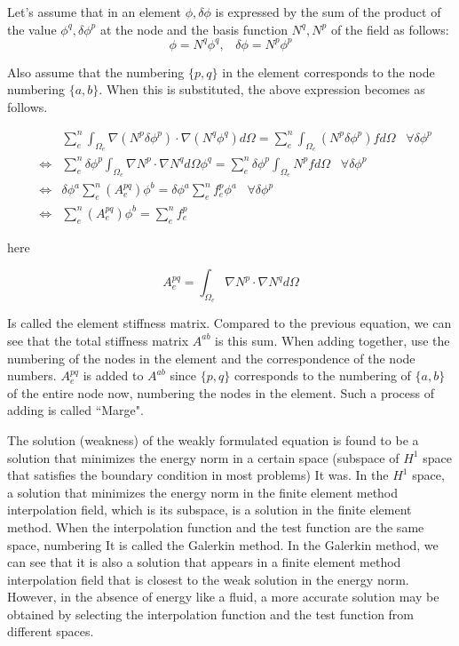 Let's assume that in an element $\phi,\delta\phi$ is expressed by the sum of the product of the value $\phi^q,\delta\phi^p$ at the node and the basis function $N^q,N^p$ of the field as follows:
%
\begin{equation}
\phi = N^q\phi^q,\;\;\;\delta\phi = N^p\phi^p
\end{equation}

Also assume that the numbering $\{p,q\}$ in the element corresponds to the node numbering $\{a,b\}$. When this is substituted, the above expression becomes as follows.

\begin{eqnarray}
&&\sum_e^n\int_{\Omega_e} \nabla (N^p\delta\phi^p)\cdot \nabla (N^q\phi^q ) d\Omega = \sum_e^n\int_{\Omega_e}(N^p\delta\phi^p) f d\Omega\;\;\;\forall\delta\phi^p\\
&\Leftrightarrow& \sum_e^n\delta\phi^p\int_{\Omega_e}\nabla N^p\cdot\nabla N^q d\Omega \phi^q = \sum_e^n\delta\phi^p\int_{\Omega_e}N^p f d\Omega\;\;\;\forall \delta\phi^p\\
&\Leftrightarrow& \delta\phi^a\sum_e^n \left(A_e^{pq}\right)\phi^b=\delta\phi^a\sum_e^n f_e^p\phi^a\;\;\;\forall \delta\phi^p\\
&\Leftrightarrow& \sum_e^n \left(A_e^{pq}\right)\phi^b=\sum_e^n f_e^p
\end{eqnarray}

here

\begin{equation}
A_e^{pq}=\int_{\Omega_e}\nabla N^p\cdot\nabla N^q d\Omega
\end{equation}

Is called the element stiffness matrix. Compared to the previous equation, we can see that the total stiffness matrix $A^{ab}$ is this sum. When adding together, use the numbering of the nodes in the element and the correspondence of the node numbers. $A_e^{pq}$ is added to $A^{ab}$ since $\{p,q\}$ corresponds to the numbering of $\{a,b\}$ of the entire node now, numbering the nodes in the element. Such a process of adding is called ``Marge".

The solution (weakness) of the weakly formulated equation is found to be a solution that minimizes the energy norm in a certain space (subspace of $H^1$ space that satisfies the boundary condition in most problems) It was.
In the $H^1$ space, a solution that minimizes the energy norm in the finite element method interpolation field, which is its subspace, is a solution in the finite element method.
When the interpolation function and the test function are the same space, numbering It is called the Galerkin method.
In the Galerkin method, we can see that it is also a solution that appears in a finite element method interpolation field that is closest to the weak solution in the energy norm.
However, in the absence of energy like a fluid, a more accurate solution may be obtained by selecting the interpolation function and the test function from different spaces.



